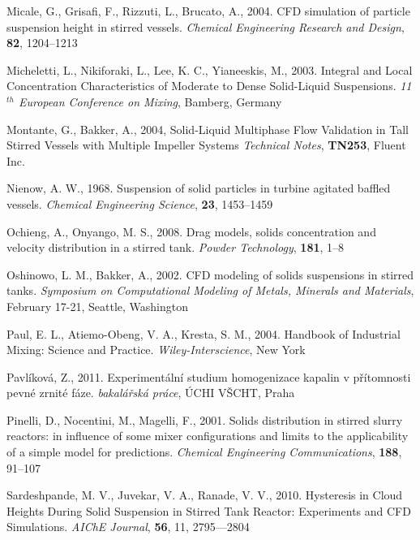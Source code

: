 \begin{thebibliography}{99}
 Micale, G., Grisafi, F., Rizzuti, L., Brucato, A., 2004. CFD simulation of particle suspension height in stirred vessels. \textit{Chemical Engineering Research and Design}, \textbf{82}, 1204--1213

 Micheletti, L., Nikiforaki, L., Lee, K. C., Yianeeskis, M., 2003. Integral and Local Concentration Characteristics of Moderate to Dense Solid-Liquid Suspensions. \textit{11$^{th}$ European Conference on Mixing}, Bamberg, Germany

 Montante, G., Bakker, A., 2004, Solid-Liquid Multiphase Flow Validation in Tall Stirred Vessels with Multiple Impeller Systems \textit{Technical Notes}, \textbf{TN253}, Fluent Inc.

 Nienow, A. W., 1968. Suspension of solid particles in turbine agitated baffled vessels. \textit{Chemical Engineering Science}, \textbf{23}, 1453--1459 

 Ochieng, A., Onyango, M. S., 2008. Drag models, solids concentration and velocity distribution in a stirred tank. \textit{Powder Technology}, \textbf{181}, 1--8

 Oshinowo, L. M., Bakker, A., 2002. CFD modeling of solids suspensions in stirred tanks. \textit{Symposium on Computational Modeling of Metals, Minerals and Materials}, February 17-21, Seattle, Washington 

 Paul, E. L., Atiemo-Obeng, V. A., Kresta, S. M., 2004. Handbook of Industrial Mixing: Science and Practice. \textit{Wiley-Interscience}, New York

 Pavlíková, Z., 2011. Experimentální studium homogenizace kapalin v přítomnosti pevné zrnité fáze. \textit{bakalářská práce}, ÚCHI VŠCHT, Praha 

 Pinelli, D., Nocentini, M., Magelli, F., 2001. Solids distribution in stirred slurry reactors: in influence of some mixer configurations and limits to the applicability of a simple model for predictions.
\textit{Chemical Engineering Communications}, \textbf{188}, 91--107

 Sardeshpande, M. V., Juvekar, V. A., Ranade, V. V., 2010. Hysteresis in Cloud Heights During Solid Suspension in Stirred Tank Reactor: Experiments and CFD Simulations. \textit{AIChE Journal}, \textbf{56}, 11, 2795---2804


\end{thebibliography}
